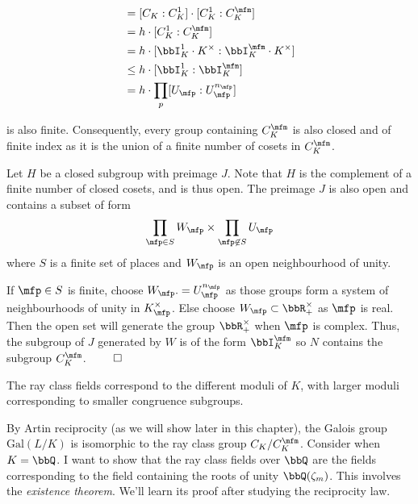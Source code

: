 \documentclass[a4paper, 12pt,oneside,openany]{book}
\begin{document}
\begin{align*}
	[C_K:C_K^\mfm] &= [C_K:C_K^1] \cdot [C_K^1:C_K^\mfm] \\
	&= h \cdot [C_K^1:C_K^\mfm] \\
	&= h \cdot [\bbI_K^1 \cdot K^\times:\bbI_K^\mfm \cdot K^\times]\\
	&\leq h \cdot [\bbI_K^1:\bbI_K^\mfm] \\
	&= h \cdot \prod\limits_p [U_\mfp:U_\mfp^{n_\mfp}]
\end{align*}

is also finite. Consequently, every group containing $C_K^\mfm$ is also closed and of finite index as it is the union of a finite number of cosets in $C_K^\mfm$.

Let $H$ be a closed subgroup with preimage $J$. Note that $H$ is the complement of a finite number of closed cosets, and is thus open. The preimage $J$ is also open and contains a subset of form $$\prod\limits_{\mfp \in S} W_\mfp \times \prod\limits_{\mfp \not\in S} U_\mfp$$ where $S$ is a finite set of places and $W_\mfp$ is an open neighbourhood of unity. 

If $\mfp \in S$ is finite, choose $W_\mfp.= U_\mfp^{n_\mfp}$ as those groups form a system of neighbourhoods of unity in $K_\mfp^\times$. Else choose $W_\mfp \subset \bbR^\times_+$ as $\mfp$ is real. Then the open set will generate the group $\bbR_+^\times$ when $\mfp$ is complex. Thus, the subgroup of $J$ generated by $W$ is of the form $\bbI_K^\mfm$ so $N$ contains the subgroup $C_K^\mfm$. $\qed$

The ray class fields correspond to the different moduli of $K$, with larger moduli corresponding to smaller congruence subgroups. 


By Artin reciprocity (as we will show later in this chapter), the Galois group $\text{Gal}(L/K)$ is isomorphic to the ray class group $C_K/C_K^\mfm$. Consider when $K=\bbQ$. I want to show that the ray class fields over $\bbQ$ are the fields corresponding to the field containing the roots of unity $\bbQ(\zeta_m)$. This involves the \emph{existence theorem}. We'll learn its proof after studying the reciprocity law. 
\end{document}
